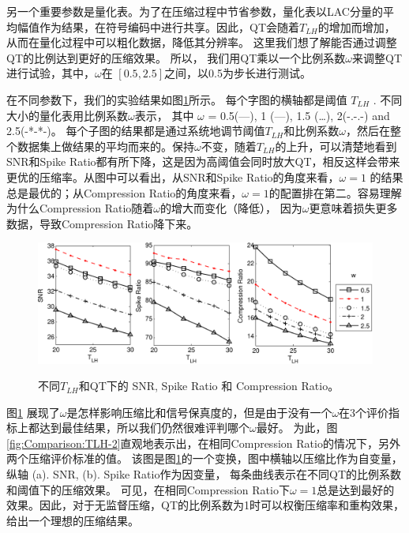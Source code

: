 另一个重要参数是量化表。为了在压缩过程中节省参数，量化表以LAC分量的平均幅值作为结果，在符号编码中进行共享。因此，QT会随着$T_{LH}$的增加而增加，从而在量化过程中可以粗化数据，降低其分辨率。 这里我们想了解能否通过调整QT的比例达到更好的压缩效果。 所以， 我们用QT乘以一个比例系数$\omega$来调整QT进行试验，其中，$\omega$在 $[0.5,2.5]$之间，以0.5为步长进行测试。


在不同参数下，我们的实验结果如图\ref{fig:Comparison-TLH}所示。 每个字图的横轴都是阈值 $T_{LH}$ . 不同大小的量化表用比例系数$\omega$表示， 其中 $\omega$ = 0.5(—), 1 (---), 1.5 (…), 2(-.-.-) and 2.5(-*-*-)。 每个子图的结果都是通过系统地调节阈值$T_{LH}$和比例系数$\omega$，然后在整个数据集上做结果的平均而来的。保持$\omega$不变，随着$T_{LH}$的上升，可以清楚地看到SNR和Spike Ratio都有所下降，这是因为高阈值会同时放大QT，相反这样会带来更优的压缩率。从图中可以看出，从SNR和Spike Ratio的角度来看，$\omega=1$ 的结果总是最优的；从Compression Ratio的角度来看，$\omega=1$的配置排在第二。容易理解为什么Compression Ratio随着$\omega$的增大而变化（降低）， 因为$\omega$更意味着损失更多数据，导致Compression Ratio降下来。


\begin{figure}[htb]
  \centering
  \includegraphics[scale=0.9]{Pictures/Compression/f10-crop.pdf}\\
  \caption{ 不同$T_{LH}$和QT下的 SNR, Spike Ratio 和 Compression Ratio。}\label{fig:Comparison-TLH}
\end{figure}


图\ref{fig:Comparison-TLH} 展现了$\omega$是怎样影响压缩比和信号保真度的，但是由于没有一个$\omega$在3个评价指标上都达到最佳结果，所以我们仍然很难评判哪个$\omega$最好。 为此，图\ref{fig:Comparison:TLH-2}直观地表示出，在相同Compression Ratio的情况下，另外两个压缩评价标准的值。 该图是图\ref{fig:Comparison-TLH}的一个变换，图中横轴以压缩比作为自变量， 纵轴 (a). SNR, (b). Spike Ratio作为因变量， 每条曲线表示在不同QT的比例系数和阈值下的压缩效果。 可见，在相同Compression Ratio下$\omega=1$总是达到最好的效果。因此，对于无监督压缩，QT的比例系数为1时可以权衡压缩率和重构效果，给出一个理想的压缩结果。


